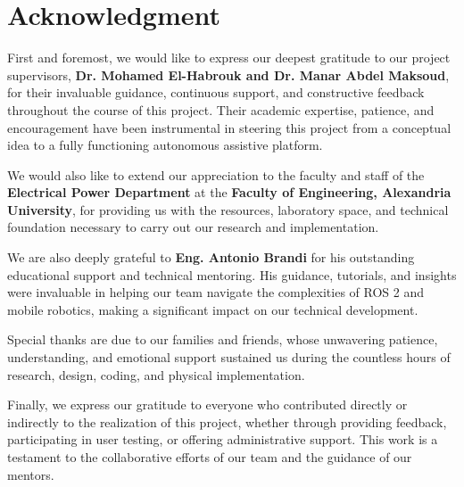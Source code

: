 \chapter*{Acknowledgment}

First and foremost, we would like to express our deepest gratitude to our project supervisors, \textbf{Dr. Mohamed El-Habrouk and Dr. Manar Abdel Maksoud}, for their invaluable guidance, continuous support, and constructive feedback throughout the course of this project. Their academic expertise, patience, and encouragement have been instrumental in steering this project from a conceptual idea to a fully functioning autonomous assistive platform.

We would also like to extend our appreciation to the faculty and staff of the \textbf{Electrical Power Department} at the \textbf{Faculty of Engineering, Alexandria University}, for providing us with the resources, laboratory space, and technical foundation necessary to carry out our research and implementation. 

We are also deeply grateful to \textbf{Eng. Antonio Brandi} for his outstanding educational support and technical mentoring. His guidance, tutorials, and insights were invaluable in helping our team navigate the complexities of ROS 2 and mobile robotics, making a significant impact on our technical development.

Special thanks are due to our families and friends, whose unwavering patience, understanding, and emotional support sustained us during the countless hours of research, design, coding, and physical implementation.

Finally, we express our gratitude to everyone who contributed directly or indirectly to the realization of this project, whether through providing feedback, participating in user testing, or offering administrative support. This work is a testament to the collaborative efforts of our team and the guidance of our mentors.
